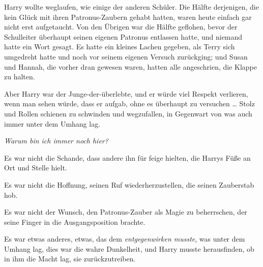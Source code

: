 Harry wollte weglaufen, wie einige der anderen Schüler. Die Hälfte derjenigen, die kein Glück mit ihren Patronus-Zaubern gehabt hatten, waren heute einfach gar nicht erst aufgetaucht. Von den Übrigen war die Hälfte geflohen, bevor der Schulleiter überhaupt seinen eigenen Patronus entlassen hatte, und niemand hatte ein Wort gesagt. Es hatte ein kleines Lachen gegeben, als Terry sich umgedreht hatte und noch vor seinem eigenen Versuch zurückging; und Susan und Hannah, die vorher dran gewesen waren, hatten alle angeschrien, die Klappe zu halten.

Aber Harry war der Junge-der-überlebte, und er würde viel Respekt verlieren, wenn man sehen würde, dass er aufgab, ohne es überhaupt zu versuchen …
Stolz und Rollen schienen zu schwinden und wegzufallen, in Gegenwart von was auch immer unter dem Umhang lag.

\emph{Warum bin ich immer noch hier?}

Es war nicht die Schande, dass andere ihn für feige hielten, die Harrys Füße an Ort und Stelle hielt.

Es war nicht die Hoffnung, seinen Ruf wiederherzustellen, die seinen Zauberstab hob.

Es war nicht der Wunsch, den Patronus-Zauber als Magie zu beherrschen, der seine Finger in die Ausgangsposition brachte.

Es war etwas anderes, etwas, das dem \emph{entgegenwirken musste}, was unter dem Umhang lag, dies war die wahre Dunkelheit, und Harry musste herausfinden, ob in ihm die Macht lag, sie zurückzutreiben.

